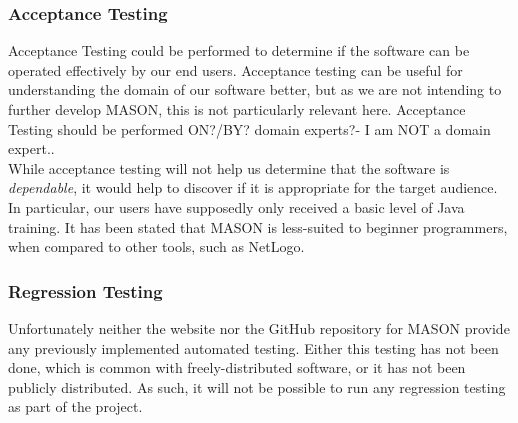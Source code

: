 \documentclass[11pt]{article}
\begin{document}
\subsubsection{Acceptance Testing}
Acceptance Testing could be performed to determine if the software can be operated effectively by our end users.
Acceptance testing can be useful for understanding the domain of our software better, but as we are not intending to further develop MASON, this is not particularly relevant here.
Acceptance Testing should be performed ON?/BY? domain experts?- I am NOT a domain expert..
\\

While acceptance testing will not help us determine that the software is \textit{dependable}, it would help to discover if it is appropriate for the target audience. In particular, our users have supposedly only received a basic level of Java training. It has been stated that MASON is less-suited to beginner programmers, when compared to other tools, such as NetLogo\cite{abm_platforms_review}.


\subsubsection{Regression Testing}
Unfortunately neither the website nor the GitHub repository for MASON provide any previously implemented automated testing.
Either this testing has not been done, which is common with freely-distributed software, or it has not been publicly distributed.
As such, it will not be possible to run any regression testing as part of the project.
\end{document}
